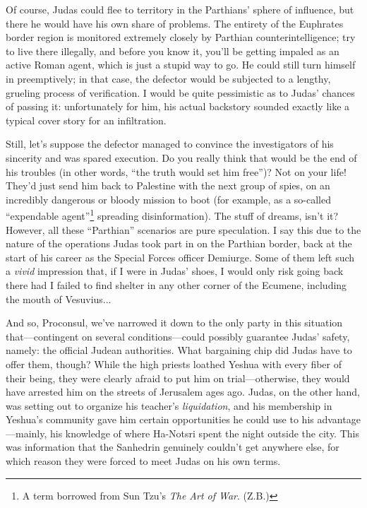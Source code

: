 Of course, Judas could flee to territory in the Parthians' sphere of influence, but there he would have his own share of problems. The entirety of the Euphrates border region is monitored extremely closely by Parthian counterintelligence; try to live there illegally, and before you know it, you'll be getting impaled as an active Roman agent, which is just a stupid way to go. He could still turn himself in preemptively; in that case, the defector would be subjected to a lengthy, grueling process of verification. I would be quite pessimistic as to Judas' chances of passing it: unfortunately for him, his actual backstory sounded exactly like a typical cover story for an infiltration.

Still, let's suppose the defector managed to convince the investigators of his sincerity and was spared execution. Do you really think that would be the end of his troubles (in other words, ``the truth would set him free'')? Not on your life! They'd just send him back to Palestine with the next group of spies, on an incredibly dangerous or bloody mission to boot (for example, as a so-called ``expendable agent''\footnote{A term borrowed from Sun Tzu's \emph{The Art of War}. (Z.B.)} spreading disinformation). The stuff of dreams, isn't it? However, all these ``Parthian'' scenarios are pure speculation. I say this due to the nature of the operations Judas took part in on the Parthian border, back at the start of his career as the Special Forces officer Demiurge. Some of them left such a \emph{vivid} impression that, if I were in Judas' shoes, I would only risk going back there had I failed to find shelter in any other corner of the Ecumene, including the mouth of Vesuvius...

And so, Proconsul, we've narrowed it down to the only party in this situation that---contingent on several conditions---could possibly guarantee Judas' safety, namely: the official Judean authorities. What bargaining chip did Judas have to offer them, though? While the high priests loathed Yeshua with every fiber of their being, they were clearly afraid to put him on trial---otherwise, they would have arrested him on the streets of Jerusalem ages ago. Judas, on the other hand, was setting out to organize his teacher's \emph{liquidation}, and his membership in Yeshua's community gave him certain opportunities he could use to his advantage---mainly, his knowledge of where Ha-Notsri spent the night outside the city. This was information that the Sanhedrin genuinely couldn't get anywhere else, for which reason they were forced to meet Judas on his own terms.

